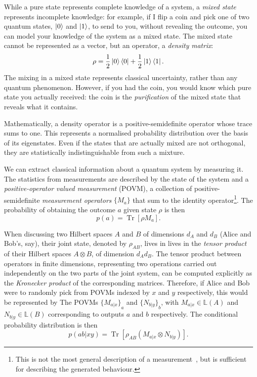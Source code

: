 \documentclass[10pt, a4paper]{article}
\numberwithin{equation}{section} %
\theoremstyle{definition}
\theoremstyle{plain}
\newcommand{\?}{\mathrel{?}} %
\newcommand{\Lin}[1]{\mathbb{L}\left(#1\right)}
\newcommand{\Tr}[2][]{\mathop{\mathrm{Tr}#1}\left[ #2 \right]} %
\begin{document}
\begin{appendices}
                    While a pure state represents complete knowledge of a system, a \emph{mixed state} represents incomplete knowledge: for example, if I flip a coin and pick one of two quantum states, \(\ket{0}\) and \(\ket{1}\), to send to you, without revealing the outcome, you can model your knowledge of the system as a mixed state. The mixed state cannot be represented as a vector, but an operator, a \emph{density matrix}:
                    \[ \rho = \frac{1}{2} \ket{0}\bra{0} + \frac{1}{2} \ket{1}\bra{1}. \]
                    The mixing in a mixed state represents classical uncertainty, rather than any quantum phenomenon. However, if you had the coin, you would know which pure state you actually received: the coin is the \emph{purification} of the mixed state that reveals what it contains.

                    Mathematically, a density operator is a positive-semidefinite operator whose trace sums to one. This represents a normalised probability distribution over the basis of its eigenstates. Even if the states that are actually mixed are not orthogonal, they are statistically indistinguishable from such a mixture.

                    We can extract classical information about a quantum system by measuring it. The statistics from measurements are described by the state of the system and a \emph{positive-operator valued measurement} (POVM), a collection of positive-semidefinite \emph{measurement operators} \(\{M_a\}\) that sum to the identity operator\footnote{This is not the most general description of a measurement~\cite[Box 2.5]{NielsenChuang}, but is sufficient for describing the generated behaviour.}. The probability of obtaining the outcome \(a\) given state \(\rho\) is then
                    \begin{equation}
                      p(a) = \Tr{\rho M_a}.
                    \end{equation}

                    When discussing two Hilbert spaces \(A\) and \(B\) of dimensions \(d_A\) and \(d_B\) (Alice and Bob's, say), their joint state, denoted by \(\rho_{AB}\), lives in lives in the \emph{tensor product} of their Hilbert spaces \(A \otimes B\), of dimension \(d_A d_B\). The tensor product between operators in finite dimensions, representing two operations carried out independently on the two parts of the joint system, can be computed explicitly as the \emph{Kronecker product} of the corresponding matrices. Therefore, if Alice and Bob were to randomly pick from POVMs indexed by \(x\) and \(y\) respectively, this would be represented by The POVMs \({\{M_{a|x}\}}_a\) and \({\{N_{b|y}\}}_b\), with \(M_{a|x} \in \Lin{A}\) and \(N_{b|y} \in \Lin{B}\) corresponding to outputs \(a\) and \(b\) respectively. The conditional probability distribution is then
                    \begin{equation}
                      p(ab|xy) = \Tr{\rho_{AB} \left(M_{a|x} \otimes N_{b|y}\right) }.
                    \end{equation}


\end{appendices}
\end{document}
